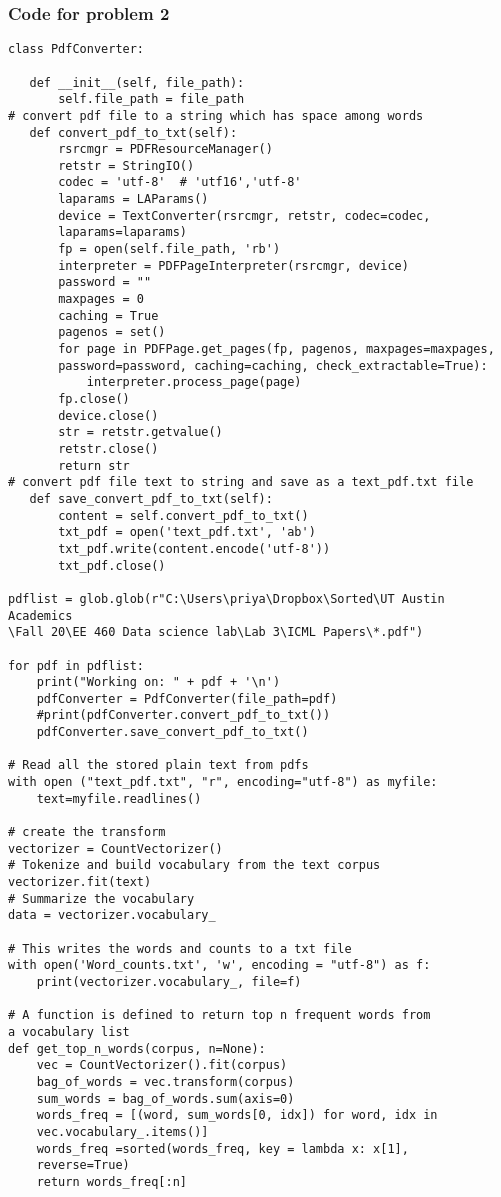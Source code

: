 \documentclass[12pt]{article}%
\begin{document}
\subsubsection*{Code for problem 2}
\begin{lstlisting}
class PdfConverter:

   def __init__(self, file_path):
       self.file_path = file_path
# convert pdf file to a string which has space among words 
   def convert_pdf_to_txt(self):
       rsrcmgr = PDFResourceManager()
       retstr = StringIO()
       codec = 'utf-8'  # 'utf16','utf-8'
       laparams = LAParams()
       device = TextConverter(rsrcmgr, retstr, codec=codec, 
       laparams=laparams)
       fp = open(self.file_path, 'rb')
       interpreter = PDFPageInterpreter(rsrcmgr, device)
       password = ""
       maxpages = 0
       caching = True
       pagenos = set()
       for page in PDFPage.get_pages(fp, pagenos, maxpages=maxpages,
       password=password, caching=caching, check_extractable=True):
           interpreter.process_page(page)
       fp.close()
       device.close()
       str = retstr.getvalue()
       retstr.close()
       return str
# convert pdf file text to string and save as a text_pdf.txt file
   def save_convert_pdf_to_txt(self):
       content = self.convert_pdf_to_txt()
       txt_pdf = open('text_pdf.txt', 'ab')
       txt_pdf.write(content.encode('utf-8'))
       txt_pdf.close()
        
pdflist = glob.glob(r"C:\Users\priya\Dropbox\Sorted\UT Austin Academics
\Fall 20\EE 460 Data science lab\Lab 3\ICML Papers\*.pdf")

for pdf in pdflist:
    print("Working on: " + pdf + '\n')
    pdfConverter = PdfConverter(file_path=pdf)
    #print(pdfConverter.convert_pdf_to_txt())
    pdfConverter.save_convert_pdf_to_txt()
    
# Read all the stored plain text from pdfs
with open ("text_pdf.txt", "r", encoding="utf-8") as myfile:
    text=myfile.readlines()

# create the transform
vectorizer = CountVectorizer()
# Tokenize and build vocabulary from the text corpus
vectorizer.fit(text)
# Summarize the vocabulary
data = vectorizer.vocabulary_

# This writes the words and counts to a txt file
with open('Word_counts.txt', 'w', encoding = "utf-8") as f:
    print(vectorizer.vocabulary_, file=f)

# A function is defined to return top n frequent words from
a vocabulary list
def get_top_n_words(corpus, n=None):
    vec = CountVectorizer().fit(corpus)
    bag_of_words = vec.transform(corpus)
    sum_words = bag_of_words.sum(axis=0) 
    words_freq = [(word, sum_words[0, idx]) for word, idx in 
    vec.vocabulary_.items()]
    words_freq =sorted(words_freq, key = lambda x: x[1], 
    reverse=True)
    return words_freq[:n]


\end{lstlisting}
\end{document}
